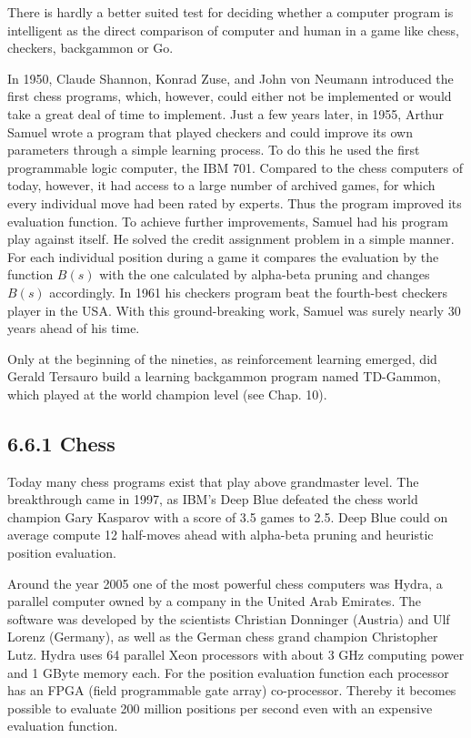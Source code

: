 \documentclass[10pt]{article}
\begin{document}
There is hardly a better suited test for deciding whether a computer program is intelligent as the direct comparison of computer and human in a game like chess, checkers, backgammon or Go.

In 1950, Claude Shannon, Konrad Zuse, and John von Neumann introduced the first chess programs, which, however, could either not be implemented or would take a great deal of time to implement. Just a few years later, in 1955, Arthur Samuel wrote a program that played checkers and could improve its own parameters through a simple learning process. To do this he used the first programmable logic computer, the IBM 701. Compared to the chess computers of today, however, it had access to a large number of archived games, for which every individual move had been rated by experts. Thus the program improved its evaluation function. To achieve further improvements, Samuel had his program play against itself. He solved the credit assignment problem in a simple manner. For each individual position during a game it compares the evaluation by the function $B(s)$ with the one calculated by alpha-beta pruning and changes $B(s)$ accordingly. In 1961 his checkers program beat the fourth-best checkers player in the USA. With this ground-breaking work, Samuel was surely nearly 30 years ahead of his time.

Only at the beginning of the nineties, as reinforcement learning emerged, did Gerald Tersauro build a learning backgammon program named TD-Gammon, which played at the world champion level (see Chap. 10).

\subsection*{6.6.1 Chess}
Today many chess programs exist that play above grandmaster level. The breakthrough came in 1997, as IBM's Deep Blue defeated the chess world champion Gary Kasparov with a score of 3.5 games to 2.5. Deep Blue could on average compute 12 half-moves ahead with alpha-beta pruning and heuristic position evaluation.

Around the year 2005 one of the most powerful chess computers was Hydra, a parallel computer owned by a company in the United Arab Emirates. The software was developed by the scientists Christian Donninger (Austria) and Ulf Lorenz (Germany), as well as the German chess grand champion Christopher Lutz. Hydra uses 64 parallel Xeon processors with about 3 GHz computing power and 1 GByte memory each. For the position evaluation function each processor has an FPGA (field programmable gate array) co-processor. Thereby it becomes possible to evaluate 200 million positions per second even with an expensive evaluation function.
\end{document}
